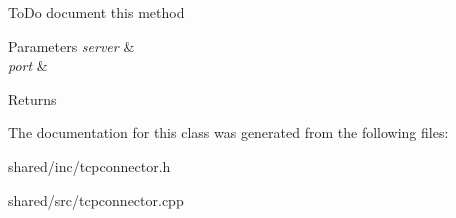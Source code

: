 To\+Do document this method


\begin{DoxyParams}{Parameters}
{\em server} & \\
\hline
{\em port} & \\
\hline
\end{DoxyParams}
\begin{DoxyReturn}{Returns}

\end{DoxyReturn}


The documentation for this class was generated from the following files\+:\begin{DoxyCompactItemize}
\item 
shared/inc/tcpconnector.\+h\item 
shared/src/tcpconnector.\+cpp\end{DoxyCompactItemize}
